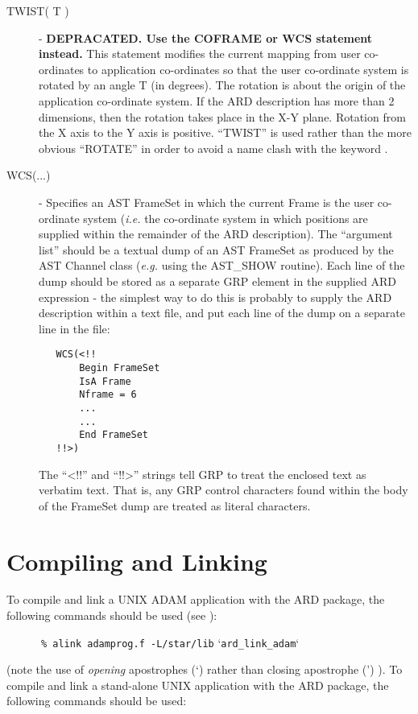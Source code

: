 \begin{description}
\item [\label{ST:TWI}TWIST( T )] - {\bf DEPRACATED. Use the COFRAME or WCS statement instead.} This statement modifies the current mapping from user
co-ordinates to application co-ordinates so that the user co-ordinate system is
rotated by an angle T (in degrees). The rotation is about the origin of the
application co-ordinate system. If the ARD description has more than 2
dimensions, then the rotation takes place in the X-Y plane. Rotation from the X
axis to the Y axis is positive. ``TWIST'' is used rather than the more obvious
``ROTATE'' in order to avoid a name clash with the keyword
. 

\item [\label{ST:WCS}WCS(...)] - Specifies an AST FrameSet in which the
current Frame is the user co-ordinate system ({\em i.e.} the co-ordinate
system in which positions are supplied within the remainder of the ARD
description). The ``argument list'' should be a textual dump of an AST
FrameSet as produced by the AST Channel class ({\em e.g.} using the
AST\_SHOW routine). Each line of the dump should be stored as a separate
GRP element in the supplied ARD expression - the simplest way to do this
is probably to supply the ARD description within a text file, and put
each line of the dump on a separate line in the file:

\small
\begin{verbatim}
   WCS(<!!
       Begin FrameSet 
       IsA Frame      
       Nframe = 6  
       ...
       ...
       End FrameSet
   !!>)
\end{verbatim}
\normalsize

The ``<!!'' and ``!!>'' strings tell GRP to treat the enclosed text as
verbatim text. That is, any GRP control characters found within the
body of the FrameSet dump are treated as literal characters.

\end{description}

\section{Compiling and Linking}

To compile and link a UNIX ADAM application with the ARD package, the following
commands should be used (see ): 

\small
\verb#      % alink adamprog.f -L/star/lib# `\verb#ard_link_adam#`
\normalsize

(note the use of {\em opening} apostrophes (`) rather than 
closing apostrophe (') ). To compile and link a stand-alone UNIX application with
the ARD package, the following commands should be used: 

